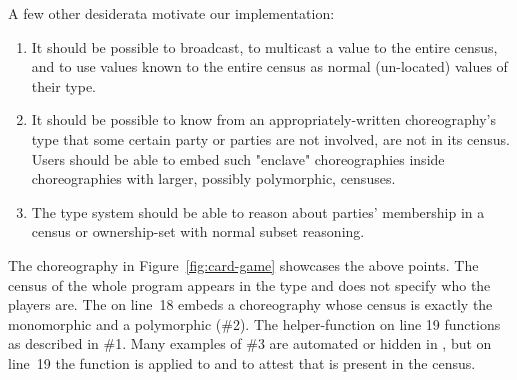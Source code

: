 A few other desiderata motivate our implementation:
\begin{enumerate}
    \item It should be possible to broadcast, \ie to multicast a value to the entire census,
          and to use values known to the entire census as normal (un-located) values of their type.
    \item It should be possible to know from an appropriately-written choreography's type that some
          certain party or parties are not involved, are not in its census.
          Users should be able to embed such "enclave" choreographies inside choreographies with larger,
          possibly polymorphic, censuses.
    \item The type system should be able to reason about parties'
          membership in a census or ownership-set
          with normal subset reasoning.
\end{enumerate}
The choreography in Figure~\ref{fig:card-game} showcases the above points.
The census of the whole program appears in the type
and does not specify who the players are.
The  on line~18
embeds a choreography whose census is exactly the monomorphic 
and a polymorphic  (\#2).
The helper-function  on line 19 functions as described in \#1.
Many examples of \#3 are automated or hidden in \MultiChor,
but on line~19 the function  is applied to
and 
to attest that  is present in the census.

\begin{figure*}[tbhp]
    \begin{mdframed}
    \inputminted[xleftmargin=10pt,linenos,fontsize=\scriptsize]{haskell}{figures/census-poly-example.hs.txt}
    \caption{A card game expressed as a choreography written in \MultiChor.
             This choreography is polymorphic over the number and identity of the players,
             but the party named  is an explicit member.
             The inner monad  that all parties have access to is a simple freer monad
             that can be handled to IO operations, or as  for testing purposes.
             The  encapsulates the modulo operation in its
              instance.}
    \label{fig:card-game}
    \end{mdframed}
\end{figure*}


